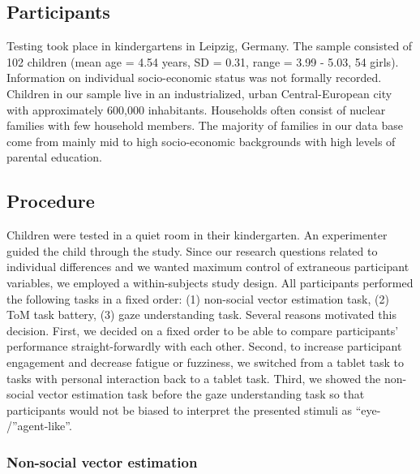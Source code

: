 \documentclass[
  man,floatsintext]{apa6}
\begin{document}
\hypertarget{participants-2}{%
\subsection{Participants}\label{participants-2}}

Testing took place in kindergartens in Leipzig, Germany.
The sample consisted of 102 children (mean age = 4.54 years, SD = 0.31, range = 3.99 - 5.03, 54 girls).
Information on individual socio-economic status was not formally recorded.
Children in our sample live in an industrialized, urban Central-European city with approximately 600,000 inhabitants.
Households often consist of nuclear families with few household members.
The majority of families in our data base come from mainly mid to high socio-economic backgrounds with high levels of parental education.

\hypertarget{procedure-2}{%
\subsection{Procedure}\label{procedure-2}}

Children were tested in a quiet room in their kindergarten.
An experimenter guided the child through the study.
Since our research questions related to individual differences and we wanted maximum control of extraneous participant variables, we employed a within-subjects study design.
All participants performed the following tasks in a fixed order: (1) non-social vector estimation task, (2) ToM task battery, (3) gaze understanding task.
Several reasons motivated this decision.
First, we decided on a fixed order to be able to compare participants' performance straight-forwardly with each other.
Second, to increase participant engagement and decrease fatigue or fuzziness, we switched from a tablet task to tasks with personal interaction back to a tablet task.
Third, we showed the non-social vector estimation task before the gaze understanding task so that participants would not be biased to interpret the presented stimuli as ``eye- /''agent-like''.

\hypertarget{non-social-vector-estimation}{%
\subsubsection{Non-social vector estimation}\label{non-social-vector-estimation}}
\end{document}
